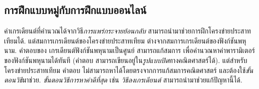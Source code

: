 





\subsection{การฝึกแบบหมู่กับการฝึกแบบออนไลน์}
\label{sec: online and batch training}

ค่าเกรเดียนต์ที่คำนวณได้จากวิธี\textit{การแพร่กระจายย้อนกลับ}
สามารถนำมาช่วยการฝึกโครงข่ายประสาทเทียมได้.
แต่สมการเกรเดียนต์ของโครงข่ายประสาทเทียม
ต่างจากสมการเกรเดียนต์ของฟังก์ชันพหุนาม.
คำตอบของ
เกรเดียนต์ฟังก์ชันพหุนามเป็นศูนย์
สามารถแก้สมการ
เพื่อคำนวณหาค่าพารามิเตอร์ของฟังก์ชันพหุนามได้ทันที (คำตอบ สามารถเขียนอยู่ใน\textit{รูปแบบปิด}ทางคณิตศาสตร์ได้).
แต่สำหรับโครงข่ายประสาทเทียม
คำตอบ ไม่สามารถหาได้โดยตรงจากการแก้สมการคณิตศาสตร์
และต้องใช้\textit{ขั้นตอนวิธี}มาช่วย.
\textit{ขั้นตอนวิธีการหาค่าดีที่สุด} เช่น \textit{วิธีลงเกรเดียนต์}
สามารถนำมาช่วยแก้ปัญหานี้ได้.

